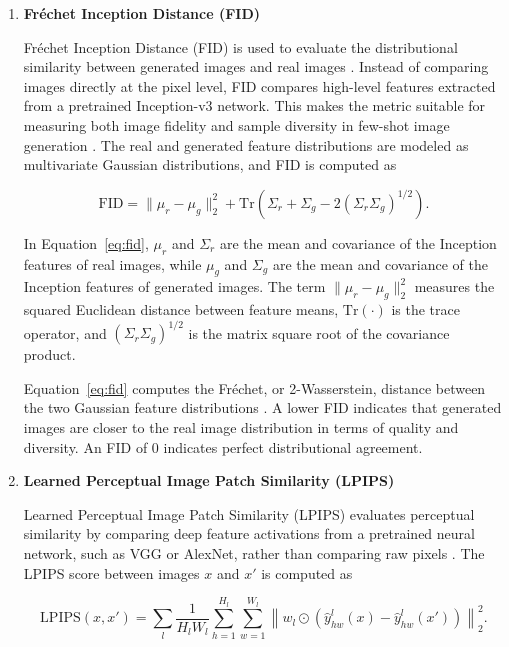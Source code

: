 \begin{enumerate}[listparindent=\parindent, parsep=0pt]
    \item \textbf{Fr\'echet Inception Distance (FID)}

    Fr\'echet Inception Distance (FID) is used to evaluate the distributional similarity between generated images and real images \citep{heusel2017gans, wang2023attribute}. Instead of comparing images directly at the pixel level, FID compares high-level features extracted from a pretrained Inception-v3 network. This makes the metric suitable for measuring both image fidelity and sample diversity in few-shot image generation \citep{borji2022pros}. The real and generated feature distributions are modeled as multivariate Gaussian distributions, and FID is computed as

    \begin{equation}
        \mathrm{FID} =
        \|\mu_r - \mu_g\|_2^2 +
        \mathrm{Tr}\left(\Sigma_r + \Sigma_g - 2(\Sigma_r\Sigma_g)^{1/2}\right).
        \label{eq:fid}
    \end{equation}

    In Equation~\eqref{eq:fid}, $\mu_r$ and $\Sigma_r$ are the mean and covariance of the Inception features of real images, while $\mu_g$ and $\Sigma_g$ are the mean and covariance of the Inception features of generated images. The term $\|\mu_r-\mu_g\|_2^2$ measures the squared Euclidean distance between feature means, $\mathrm{Tr}(\cdot)$ is the trace operator, and $(\Sigma_r\Sigma_g)^{1/2}$ is the matrix square root of the covariance product.

    Equation~\eqref{eq:fid} computes the Fr\'echet, or 2-Wasserstein, distance between the two Gaussian feature distributions \citep{heusel2017gans}. A lower FID indicates that generated images are closer to the real image distribution in terms of quality and diversity. An FID of 0 indicates perfect distributional agreement.

    \item \textbf{Learned Perceptual Image Patch Similarity (LPIPS)}

    Learned Perceptual Image Patch Similarity (LPIPS) evaluates perceptual similarity by comparing deep feature activations from a pretrained neural network, such as VGG or AlexNet, rather than comparing raw pixels \citep{zhang2018unreasonable}. The LPIPS score between images $x$ and $x'$ is computed as

    \begin{equation}
        \mathrm{LPIPS}(x,x') =
        \sum_l \frac{1}{H_l W_l}
        \sum_{h=1}^{H_l}\sum_{w=1}^{W_l}
        \left\|w_l \odot
        \left(\hat{y}_{hw}^{l}(x)-\hat{y}_{hw}^{l}(x')\right)
        \right\|_2^2.
        \label{eq:lpips}
    \end{equation}


\end{enumerate}
